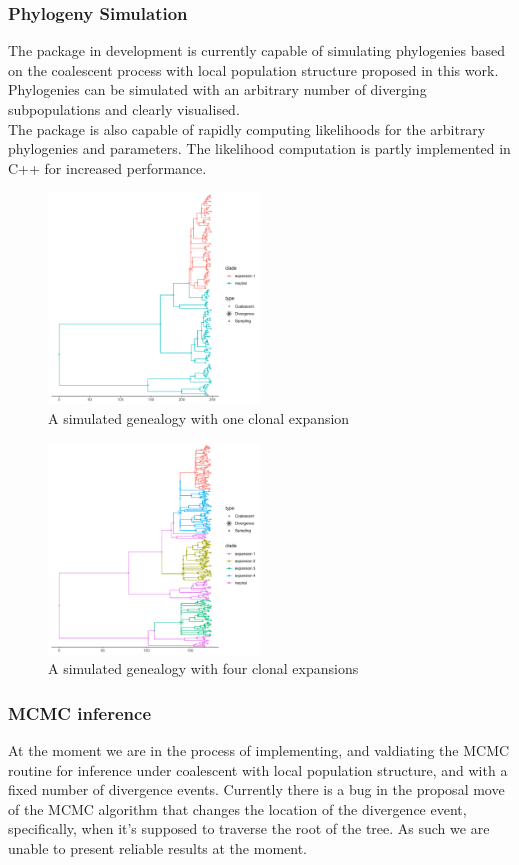 \documentclass{ieeeaccess}
\theoremstyle{definition}
\begin{document}
\subsubsection{Phylogeny Simulation}
The package in development is currently capable of simulating phylogenies based on the coalescent process with local population structure proposed in this work. 
Phylogenies can be simulated with an arbitrary number of diverging subpopulations and clearly visualised.\\
The package is also capable of rapidly computing likelihoods for the arbitrary phylogenies and parameters. The likelihood computation is partly implemented in C++ for increased performance. 
\begin{figure}[H]
  \centering
     \includegraphics[width=0.5\textwidth]{../R/tree_structured}
    \caption{A simulated genealogy with one clonal expansion}
\end{figure}
\begin{figure}[H]
  \centering
     \includegraphics[width=0.5\textwidth]{../R/2events/tree_structured}
    \caption{A simulated genealogy with four clonal expansions}
\end{figure}
\subsubsection{MCMC inference}
At the moment we are in the process of implementing, and valdiating the MCMC routine for inference under coalescent with local population structure, and with a fixed number of divergence events. Currently there is a bug in the proposal move of the MCMC algorithm that changes the location of the divergence event, specifically, when it's supposed to traverse the root of the tree. As such we are unable to present reliable results at the moment. 
\end{document}
